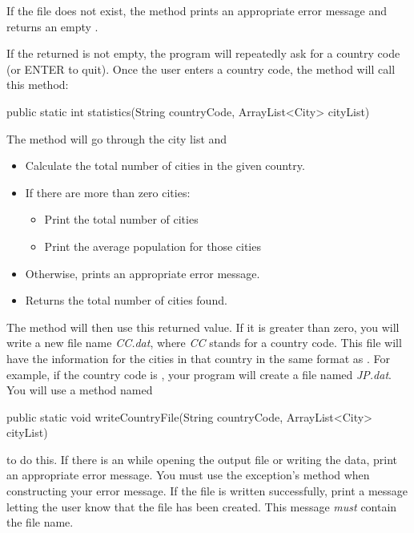 \begin{exercise}
If the file does not exist, the method prints an appropriate error message and returns an empty .

If the returned  is not empty, the program will repeatedly ask for a country code (or ENTER to quit).
Once the user enters a country code, the  method will call this method:

\begin{stdout}
public static int statistics(String countryCode,
   ArrayList<City> cityList)
\end{stdout}

The  method will go through the city list and

\begin{itemize}
    \item Calculate the total number of cities in the given country.
    \item If there are more than zero cities:
        \begin{itemize}
            \item Print the total number of cities
            \item Print the average population for those cities
        \end{itemize}
    
    \item Otherwise, prints an appropriate error message.
    \item Returns the total number of cities found.
\end{itemize}

The  method will then use this returned value. If it is greater than zero, you will write a new file name {\em CC.dat}, where {\em CC} stands for a country code. This file will have the information for the cities in that country in the same format as . For example, if the country code is , your program will create a file named {\em JP.dat}. You will use a method named

\begin{stdout}
public static void writeCountryFile(String countryCode,
    ArrayList<City> cityList)
\end{stdout}

to do this. If there is an  while opening the output file or writing the data, print an appropriate error message. You must use the exception's  method when constructing your error message. If the file is written successfully, print a message letting the user know that the file has been created. This message {\em must} contain the file name.


\end{exercise}
